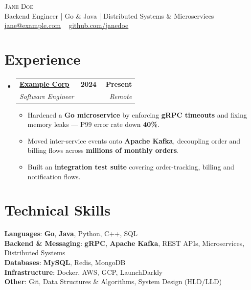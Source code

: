 \documentclass[letterpaper,11pt]{article}
\makeatletter
\newcommand{\resumeItem}[1]{
  \item\small{
    {#1 \vspace{-2pt}}
  }
}
\newcommand{\resumeSubheading}[4]{
  \vspace{-2pt}\item
    \begin{tabular*}{1.0\textwidth}[t]{l@{\extracolsep{\fill}}r}
      \textbf{#1} & \textbf{\small #2} \\
      \textit{\small#3} & \textit{\small #4} \\
    \end{tabular*}\vspace{-7pt}
}
\newcommand{\resumeSubHeadingListStart}{\begin{itemize}[leftmargin=0.0in, label={}]}
\newcommand{\resumeSubHeadingListEnd}{\end{itemize}}
\newcommand{\resumeItemListStart}{\begin{itemize}}
\newcommand{\resumeItemListEnd}{\end{itemize}\vspace{-5pt}}
\makeatother
\begin{document}
\begin{center}
    {\Huge \scshape Jane Doe} \\ \vspace{1pt}
    \small Backend Engineer | Go \& Java | Distributed Systems \& Microservices \\ \vspace{1pt}
    \small \href{mailto:jane@example.com}{\underline{jane@example.com}} ~
    \href{https://github.com/janedoe}{\underline{github.com/janedoe}}
    \vspace{-8pt}
\end{center}

\section{Experience}
\resumeSubHeadingListStart

    \resumeSubheading
    {\href{https://example.com/}{Example Corp}}{2024 -- Present}
    {Software Engineer}{Remote}
    \resumeItemListStart
        \resumeItem{Hardened a \textbf{Go microservice} by enforcing \textbf{gRPC timeouts} and fixing memory leaks — P99 error rate down \textbf{40\%}.}
        \resumeItem{Moved inter-service events onto \textbf{Apache Kafka}, decoupling order and billing flows across \textbf{millions of monthly orders}.}
        \resumeItem{Built an \textbf{integration test suite} covering order-tracking, billing and notification flows.}
    \resumeItemListEnd

\resumeSubHeadingListEnd
\vspace{-16pt}

\section{Technical Skills}
 \begin{itemize}[leftmargin=0.15in, label={}]
    \small{\item{
     \textbf{Languages}{: \textbf{Go}, \textbf{Java}, Python, C++, SQL} \\
     \textbf{Backend \& Messaging}{: \textbf{gRPC}, \textbf{Apache Kafka}, REST APIs, Microservices, Distributed Systems} \\
     \textbf{Databases}{: \textbf{MySQL}, Redis, MongoDB} \\
     \textbf{Infrastructure}{: Docker, AWS, GCP, LaunchDarkly} \\
     \textbf{Other}{: Git, Data Structures \& Algorithms, System Design (HLD/LLD)} \\
    }}
 \end{itemize}
 \vspace{-16pt}
\end{document}
